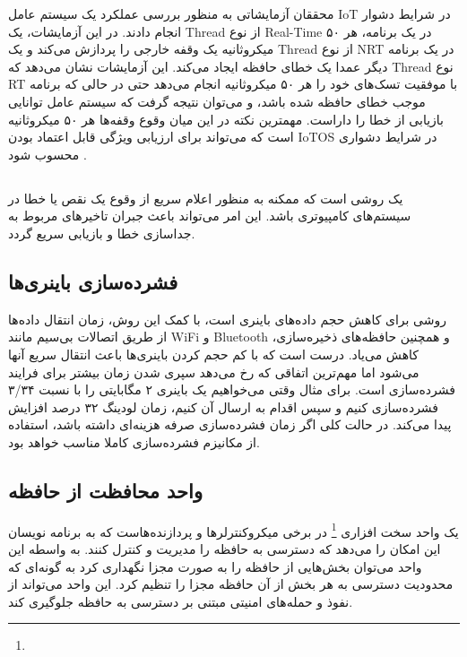 \documentclass[10pt, a4paper]{article}
\begin{document}
محققان آزمایشاتی به منظور بررسی عملکرد یک سیستم عامل IoT در شرایط دشوار انجام
دادند. در این آزمایشات، یک Thread از نوع Real-Time در یک برنامه، هر ۵۰
میکروثانیه یک وقفه خارجی را پردازش می‌کند و یک Thread از نوع NRT در یک برنامه
دیگر عمدا یک خطای حافظه ایجاد می‌کند. این آزمایشات نشان می‌دهد که Thread نوع RT
با موفقیت تسک‌های خود را هر ۵۰ میکروثانیه انجام می‌دهد حتی در حالی که برنامه
موجب خطای حافظه شده باشد، و می‌توان نتیجه گرفت که سیستم عامل توانایی بازیابی از
خطا را داراست. مهمترین نکته در این میان وقوع وقفه‌ها هر ۵۰ میکروثانیه است که
می‌تواند برای ارزیابی ویژگی قابل اعتماد بودن IoTOS در شرایط دشواری محسوب شود
\cite{samsung21tizen}.

\subsection{}

یک روشی است که ممکنه به منظور اعلام سریع از وقوع یک نقص یا خطا در سیستم‌های
کامپیوتری باشد. این امر می‌تواند باعث جبران تاخیر‌های مربوط به جداسازی خطا و
بازیابی سریع گردد.

\subsection{فشرده‌سازی باینری‌ها}

روشی برای کاهش حجم داده‌های باینری است، با کمک این روش، زمان انتقال داده‌ها از
طریق اتصالات بی‌سیم مانند WiFi و Bluetooth و همچنین حافظه‌های ذخیره‌سازی، کاهش
می‌یاد. درست است که با کم حجم کردن باینری‌ها باعث انتقال سریع آنها می‌شود اما
مهم‌ترین اتفاقی که رخ می‌دهد سپری شدن زمان بیشتر برای فرایند فشرده‌سازی است.
برای مثال وقتی می‌خواهیم یک باینری ۲ مگابایتی را با نسبت ۳/۳۴ فشرده‌سازی کنیم و
سپس اقدام به ارسال آن کنیم، زمان لودینگ ۳۲ درصد افزایش پیدا می‌کند. در حالت کلی
اگر زمان فشرده‌سازی صرفه هزینه‌ای داشته باشد، استفاده از مکانیزم فشرده‌سازی
کاملا مناسب خواهد بود.

\subsection{واحد محافظت از حافظه}

یک واحد سخت افزاری \footnote{} در برخی میکروکنترلر‌ها
و پردازنده‌هاست که به برنامه نویسان این امکان را می‌دهد که دسترسی به حافظه را
مدیریت و کنترل کنند. به واسطه این واحد می‌توان بخش‌هایی از حافظه را به صورت مجزا
نگهداری کرد به گونه‌ای که محدودیت دسترسی به هر بخش‌ از آن حافظه مجزا را تنظیم
کرد. این واحد می‌تواند از نفوذ و حمله‌های امنیتی مبتنی بر دسترسی به حافظه
جلوگیری کند.
\end{document}
